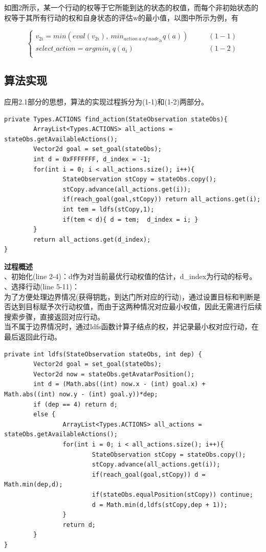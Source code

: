 \documentclass[UTF8]{article}
\begin{document}
\indent 如图2所示，某一个行动的权等于它所能到达的状态的权值，而每个非初始状态的权等于其所有行动的权和自身状态的评估w的最小值，以图中所示为例，有

\begin{equation}
\begin{cases}
v_{2i} = min(eval(v_{2i}),\ min_{action\ a\ of\ node_{2i}} q(a))\qquad& (1-1)\\
select\_action = argmin_i\ q(a_i)\qquad&(1-2)\\
\end{cases}	
\end{equation}

\subsection{算法实现}
\indent 应用2.1部分的思想，算法的实现过程拆分为(1-1)和(1-2)两部分。\\
\begin{lstlisting}[caption=实现等式(1-1)]
private Types.ACTIONS find_action(StateObservation stateObs){
		ArrayList<Types.ACTIONS> all_actions = stateObs.getAvailableActions();
		Vector2d goal = set_goal(stateObs);
		int d = 0xFFFFFFF, d_index = -1;
		for(int i = 0; i < all_actions.size(); i++){
				StateObservation stCopy = stateObs.copy();
				stCopy.advance(all_actions.get(i));
				if(reach_goal(goal,stCopy)) return all_actions.get(i);
				int tem = ldfs(stCopy,1);
				if(tem < d){ d = tem;  d_index = i; }
		}
		return all_actions.get(d_index);
}
\end{lstlisting}

\noindent\textbf{过程概述}\\
、初始化(line 2-4)：d作为对当前最优行动权值的估计，d\_index为行动的标号。\\
、选择行动(line 5-11)：\\
\indent 为了方便处理边界情况(获得钥匙，到达门所对应的行动)，通过设置目标和判断是否达到目标赋予次行动权值，而由于这两种情况对应最小权值，因此无需进行后续搜索步骤，直接返回对应行动。\\
\indent 当不属于边界情况时，通过ldfs函数计算子结点的权，并记录最小权对应行动，在最后返回此行动。\\

\begin{lstlisting}[caption=实现等式(1-2)]
private int ldfs(StateObservation stateObs, int dep) {
		Vector2d goal = set_goal(stateObs);
		Vector2d now = stateObs.getAvatarPosition();
		int d = (Math.abs((int) now.x - (int) goal.x) +  Math.abs((int) now.y - (int) goal.y))*dep;
		if (dep == 4) return d;
		else {
				ArrayList<Types.ACTIONS> all_actions = stateObs.getAvailableActions();
				for(int i = 0; i < all_actions.size(); i++){
						StateObservation stCopy = stateObs.copy();
						stCopy.advance(all_actions.get(i));
						if(reach_goal(goal,stCopy)) d = Math.min(dep,d); 
						if(stateObs.equalPosition(stCopy)) continue;
						d = Math.min(d,ldfs(stCopy,dep + 1));
				}
				return d;
		}
}
\end{lstlisting}
\end{document}
